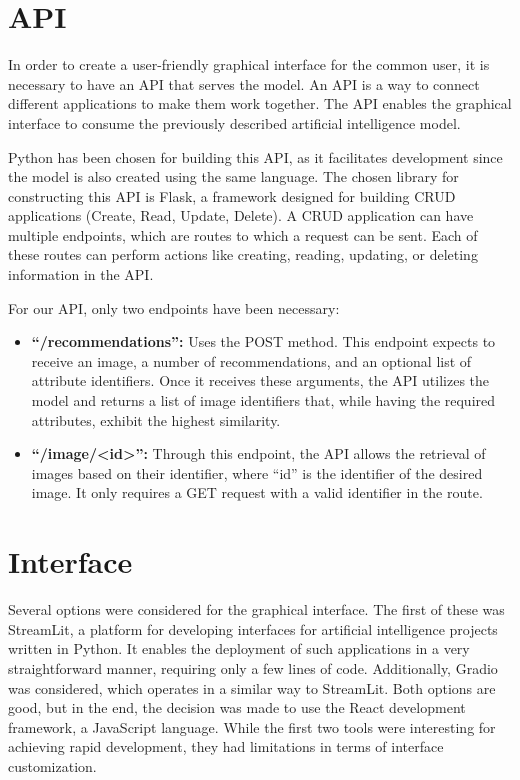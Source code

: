 \documentclass[12pt]{report} %
\begin{document}
\section*{API}
In order to create a user-friendly graphical interface for the common user, it is necessary to have an API that serves the model. An API is a way to connect different applications to make them work together. The API enables the graphical interface to consume the previously described artificial intelligence model.

Python has been chosen for building this API, as it facilitates development since the model is also created using the same language. The chosen library for constructing this API is Flask, a framework designed for building CRUD applications (Create, Read, Update, Delete). A CRUD application can have multiple endpoints, which are routes to which a request can be sent. Each of these routes can perform actions like creating, reading, updating, or deleting information in the API.

For our API, only two endpoints have been necessary:

\begin{itemize}
	\item \textbf{``/recommendations'':}
	Uses the POST method. This endpoint expects to receive an image, a number of recommendations, and an optional list of attribute identifiers. Once it receives these arguments, the API utilizes the model and returns a list of image identifiers that, while having the required attributes, exhibit the highest similarity.
	\item \textbf{``/image/<id>'':}
	Through this endpoint, the API allows the retrieval of images based on their identifier, where ``id'' is the identifier of the desired image. It only requires a GET request with a valid identifier in the route.
\end{itemize}

\section*{Interface}
Several options were considered for the graphical interface. The first of these was StreamLit, a platform for developing interfaces for artificial intelligence projects written in Python. It enables the deployment of such applications in a very straightforward manner, requiring only a few lines of code. Additionally, Gradio was considered, which operates in a similar way to StreamLit. Both options are good, but in the end, the decision was made to use the React development framework, a JavaScript language. While the first two tools were interesting for achieving rapid development, they had limitations in terms of interface customization.
\end{document}
